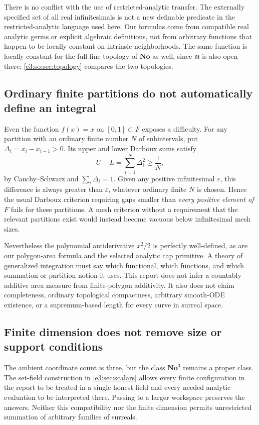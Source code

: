 \documentclass[11pt,letterpaper]{article}
\numberwithin{equation}{section}
\theoremstyle{definition}
\theoremstyle{remark}
\newcommand{\No}{\mathbf{No}}
\newcommand{\mm}{\mathfrak m}
\newcommand{\eps}{\varepsilon}
\begin{document}
There is no conflict with the use of restricted-analytic transfer.
The externally specified set of all real infinitesimals is not a
new definable predicate in the restricted-analytic language used
here. Our formulas come from compatible real analytic germs or explicit
algebraic definitions, not from arbitrary functions that happen to be
locally constant on intrinsic neighborhoods. The same function is locally
constant for the full fine topology of $\No$ as well, since $\mm$ is also open
there; \cref{e3:so:sec:topology} compares the two topologies.

\subsection{Ordinary finite partitions do not automatically define an integral}

Even the function $f(x)=x$ on $[0,1]\subset F$ exposes a difficulty.
For any partition with an ordinary finite number $N$ of subintervals,
put $\Delta_i=x_i-x_{i-1}>0$. Its upper and lower Darboux sums satisfy
\[
 U-L=\sum_{i=1}^N\Delta_i^2\ge\frac1N,
\]
by Cauchy--Schwarz and $\sum_i\Delta_i=1$. Given any positive
infinitesimal $\eps$, this difference is always greater than $\eps$,
whatever ordinary finite $N$ is chosen. Hence the usual Darboux
criterion requiring gaps smaller than \emph{every positive element
of $F$} fails for these partitions. A mesh criterion without a
requirement that the relevant partitions exist would instead become
vacuous below infinitesimal mesh sizes.

Nevertheless the polynomial antiderivative $x^2/2$ is perfectly
well-defined, as are our polygon-area formula and the selected analytic
cap primitive. A theory of generalized integration must say which
functional, which functions, and which summation or partition notion it
uses. This report does not infer a countably additive area measure
from finite-polygon additivity. It also does not claim completeness,
ordinary topological compactness, arbitrary smooth-ODE existence, or
a supremum-based length for every curve in surreal space.

\subsection{Finite dimension does not remove size or support conditions}

The ambient coordinate count is three, but the class $\No^3$ remains
a proper class. The set-field construction in \cref{e3:sec:scalars}
allows every finite configuration in the report to be treated in a
single honest field and every needed analytic evaluation to be interpreted
there. Passing to a larger workspace preserves the answers. Neither
this compatibility nor the finite dimension permits unrestricted
summation of arbitrary families of surreals.
\end{document}
